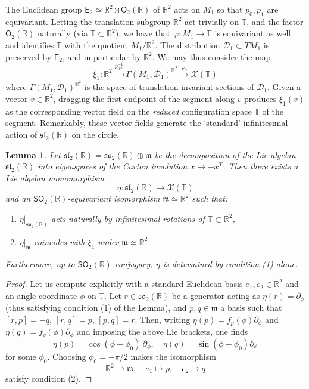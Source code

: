 \documentclass{article}
\def\fsl{\mathfrak{sl}}
\def\fso{\mathfrak{so}}
\def\fm{\mathfrak{m}}
\def\sD{\mathcal{D}}
\def\RR{\mathbb{R}}
\def\TT{\mathbb{T}}
\def\XX{\mathcal{X}}
\def\SO{\mathsf{SO}}
\def\O{\mathsf{O}}
\def\E{\mathsf{E}}
\newtheorem{lem}{Lemma}
\theoremstyle{definition}
\begin{document}
The Euclidean group $\E_2 \simeq \RR^2 \rtimes \O_2(\RR)$ of $\RR^2$ 
acts on $M_1$ so that $p_0,p_1$ are equivariant. 
Letting the translation subgroup $\RR^2$ act trivially on $\TT$,
and the factor $\O_2(\RR)$ naturally (via $\TT \subset \RR^2$),
we have that
$\varphi : M_1 \to \TT$ is equivariant as well,
and identifies $\TT$ with the quotient $M_1/\RR^2$.
The distribution $\sD_1 \subset TM_1$ is preserved by $\E_2$, and in particular
by $\RR^2$.
We may thus consider the map
\begin{equation}
        \label{eq:xi1}
        \xi_1 : \RR^2 \xrightarrow{ p_{0*}^{-1}}  \Gamma(M_1,\sD_1)^{\RR^2} \xrightarrow{\varphi_*} \XX(\TT) 
\end{equation}
where $\Gamma(M_1,\sD_1)^{\RR^2}$ is the space of translation-invariant sections of $\sD_1$.
Given a vector $v \in \RR^2$, dragging the first endpoint
of the segment along $v$ produces $\xi_1(v)$ as the corresponding
vector field on the \emph{reduced} configuration space $\TT$ of the segment.
Remarkably, these vector fields generate the `standard' infinitesimal action of $\fsl_2(\RR)$
on the circle.
\begin{lem}\label{lem:seg-sl2}
        Let $\fsl_2(\RR) = \fso_2(\RR) \oplus \fm$ be the decomposition
        of the Lie algebra $\fsl_2(\RR)$ into eigenspaces of the Cartan
        involution $x\mapsto-x^T$. Then there exists a Lie algebra monomorphism
        $$ \eta : \fsl_2(\RR) \to \XX(\TT) $$
        and an $\SO_2(\RR)$-equivariant isomorphism $\fm\simeq\RR^2$
        such that:
        \begin{enumerate}
                \item $\eta|_{\fso_2(\RR)}$ acts naturally by infinitesimal rotations of $\TT\subset \RR^2$,
                \item $\eta|_\fm$ coincides with $\xi_1$ under $\fm\simeq\RR^2$.
        \end{enumerate}
        Furthermore, up to $\SO_2(\RR)$-conjugacy, $\eta$ is determined by condition (1) alone.
\end{lem}
\begin{proof}
        Let us compute explicitly with a standard Euclidean basis $e_1,e_2 \in \RR^2$
        and an angle coordinate $\phi$ on $\TT$. Let $r \in \fso_2(\RR)$ be a generator
        acting as $\eta(r)=\partial_\phi$ (thus satisfying condition (1) of the Lemma), 
        and $p,q \in \fm$ a basis such that
        $[r,p]=-q$, $[r,q]=p$, $[p,q]=r$.
        Then, writing $\eta(p) = f_p(\phi)\partial_\phi$ and $\eta(q) = f_q(\phi)\partial_\phi$ and
        imposing the above Lie brackets,
        one finds 
        $$ \eta(p) = \cos(\phi-\phi_0)\ \partial_\phi,\quad \eta(q) = \sin(\phi-\phi_0)\partial_\phi $$
        for some $\phi_0$. Choosing $\phi_0=-\pi/2$ makes the isomorphism
        $$ \RR^2 \to \fm,\quad e_1 \mapsto p,\quad e_2\mapsto q $$
        satisfy condition (2).
\end{proof}
\end{document}
